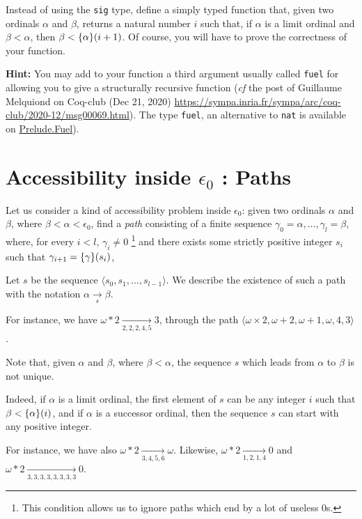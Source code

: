 
\begin{exercise}\label{exo:simply-typed-canonseq}
Instead of using the \texttt{sig} type, define a simply typed function that, given two ordinals $\alpha$ and $\beta$, returns a natural number $i$ such that, if $\alpha$ is a limit ordinal and $\beta<\alpha$, then $\beta< \mbox{$\{\alpha\}(i+1)$}$. Of course, you will have to prove the correctness of your function. 

\textbf{Hint:} You may add to your function a third argument usually called \texttt{fuel} for allowing you to give a structurally 
recursive function (\emph{cf} the post of Guillaume Melquiond on Coq-club (Dec 21, 2020)
\url{https://sympa.inria.fr/sympa/arc/coq-club/2020-12/msg00069.html}).
The type \texttt{fuel}, an alternative 
to \texttt{nat} is available on \href{../theories/html/hydras.Prelude.Fuel.html}{Prelude.Fuel}).

\end{exercise}






\section{Accessibility inside \texorpdfstring{$\epsilon_0$}{epsilon0} : Paths}
\label{sect:pathes-intro}

Let us consider a kind of accessibility problem inside $\epsilon_0$: given two ordinals $\alpha$ and $\beta$, where $\beta<\alpha<\epsilon_0$, find a \emph{path} consisting of a finite sequence $\gamma_0=\alpha,\dots,\gamma_l=\beta$,
where, for every $i<l$, $\gamma_i \not= 0$ \footnote{This condition allows us to ignore paths which end by a lot of useless $0$s.} and there exists some strictly positive integer $s_i$
such that $\gamma_{i+1}=\mbox{$\{\gamma\}(s_i)$}$,

Let $s$ be the sequence $\langle s_0,s_1,\dots, s_{l-1} \rangle$. We describe the
existence of such a path with the notation $\alpha\xrightarrow [s]{}\beta$.


For instance, we have $\omega*2 \xrightarrow[2,2,2,4,5]{}3$, through the 
path $\langle\omega\times 2, \omega+2,\omega+1,\omega,4,3\rangle$.


\begin{remark}
  

Note that, given $\alpha$ and $\beta$, where $\beta < \alpha$, the sequence $s$ which leads from $\alpha$ to $\beta$ is not unique.

Indeed, if $\alpha$ is a limit ordinal, the first element of $s$ can be any integer $i$ such that $\beta<\mbox{$\{\alpha\}(i)$}$, and if $\alpha$ is a successor ordinal,
then the sequence $s$ can start with any positive integer.


For instance, we have also 
$\omega*2 \xrightarrow[3,4,5,6]{}\omega$. 
Likewise,
$\omega*2 \xrightarrow[1,2,1,4]{} 0$ and
$\omega*2 \xrightarrow[3,3,3,3,3,3,3,3]{} 0$.
\end{remark}

